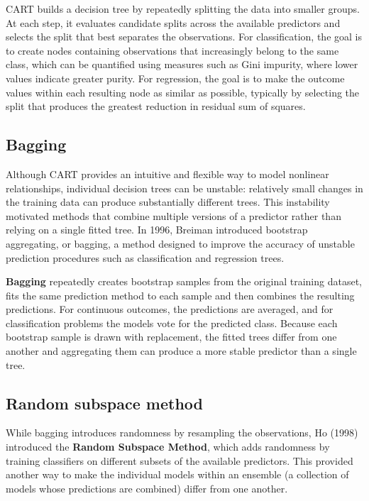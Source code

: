 \documentclass[
  letterpaper,
  DIV=11,
  numbers=noendperiod]{scrreprt}
\begin{document}
CART builds a decision tree by repeatedly splitting the data into
smaller groups. At each step, it evaluates candidate splits across the
available predictors and selects the split that best separates the
observations. For classification, the goal is to create nodes containing
observations that increasingly belong to the same class, which can be
quantified using measures such as Gini impurity, where lower values
indicate greater purity. For regression, the goal is to make the outcome
values within each resulting node as similar as possible, typically by
selecting the split that produces the greatest reduction in residual sum
of squares.

\subsection{Bagging}\label{bagging}

Although CART provides an intuitive and flexible way to model nonlinear
relationships, individual decision trees can be unstable: relatively
small changes in the training data can produce substantially different
trees. This instability motivated methods that combine multiple versions
of a predictor rather than relying on a single fitted tree. In 1996,
Breiman introduced bootstrap aggregating, or bagging, a method designed
to improve the accuracy of unstable prediction procedures such as
classification and regression trees.

\textbf{Bagging} repeatedly creates bootstrap samples from the original
training dataset, fits the same prediction method to each sample and
then combines the resulting predictions. For continuous outcomes, the
predictions are averaged, and for classification problems the models
vote for the predicted class. Because each bootstrap sample is drawn
with replacement, the fitted trees differ from one another and
aggregating them can produce a more stable predictor than a single tree.

\subsection{Random subspace method}\label{random-subspace-method}

While bagging introduces randomness by resampling the observations, Ho
(1998) introduced the \textbf{Random Subspace Method}, which adds
randomness by training classifiers on different subsets of the available
predictors. This provided another way to make the individual models
within an ensemble (a collection of models whose predictions are
combined) differ from one another.
\end{document}
